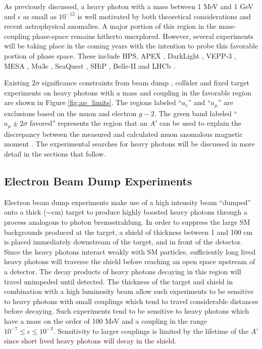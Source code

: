 As previously discussed, a heavy photon with a mass between 1 MeV and 1 GeV and
$\epsilon$ as small as $10^{-12}$ is well motivated by both theoretical
considerations and recent astrophysical anomalies.  A major portion of this
region in the mass-coupling phase-space remains hitherto unexplored. However,
several experiments will be taking place in the coming years with the intention
to probe this favorable portion of phase space. These include HPS, APEX \cite{Essig:2010xa}, 
DarkLight \cite{Freytsis:2009bh}, VEPP-3 \cite{Wojtsekhowski:2012zq},
MESA \cite{Beranek:2013yqa}, Mu3e \cite{Echenard:2014lma}, 
SeaQuest \cite{Gardner:2015wea}, SHiP \cite{Alekhin:2015byh}, Belle-II and 
LHCb \cite{Ilten:2016tkc, Ilten:2015hya}.

Existing $2\sigma$ significance constraints
from beam dump \cite{Bjorken:1988as, riordan1987, bross1991, konaka1986,
                     davier1989, Bjorken:2009mm, andreas2012, Blumlein:1990ay,
                     Blumlein:1991xh, johannes2011, johannes2014},  
collider \cite{Reece:2009un, Aubert:2009cp, Babusci:2012cr, Archilli:2011zc} 
and fixed target experiments \cite{Abrahamyan:2011gv, Merkel:2014avp,
                                   Agakishiev:2013fwl, Batley:2015lha}
on heavy photons with a mass and coupling in the favorable region are shown 
in Figure \ref{fig:ap_limits}. The regions labeled ``$a_e$'' and ``$a_\mu$'' 
are exclusions based on the muon and electron $g-2$.
The green band labeled ``$a_{\mu} \pm 2\sigma$ favored'' represents the region
that an $A'$ can be used to explain the discrepancy  between the measured and
calculated muon anomalous magnetic moment \cite{Pospelov:2008zw, Bennett:2006fi}.
The experimental searches for heavy photons will be discussed in more detail
in the sections that follow.

\subsection{Electron Beam Dump Experiments}

Electron beam dump experiments make use of a high intensity beam ``dumped'' onto
a thick ($\sim$cm) target to produce highly boosted heavy photons through a 
process analogous to photon bremsstrahlung.  In order to suppress the large
SM backgrounds produced at the target, a shield of thickness between 1 and 
100 cm
is placed immediately downstream of the target, and in front of the detector.  Since the 
heavy photons interact weakly with SM particles, sufficiently long lived 
heavy photons will traverse the shield before reaching an open space upstream
of a detector.  The decay products of heavy photons decaying in this region 
will travel unimpeded until detected.
The thickness of the target and shield in combination with a high luminosity
beam allow such experiments to be sensitive to heavy photons with small 
couplings which tend to travel considerable distances before decaying. Such 
experiments tend to be sensitive to heavy photons which have a mass on the order
of 100 MeV and a coupling in the range $10^{-7} \le \epsilon \le 10^{-3}$.  
Sensitivity to larger couplings is limited by the lifetime of the $A'$ since
short lived heavy photons will decay in the shield.

